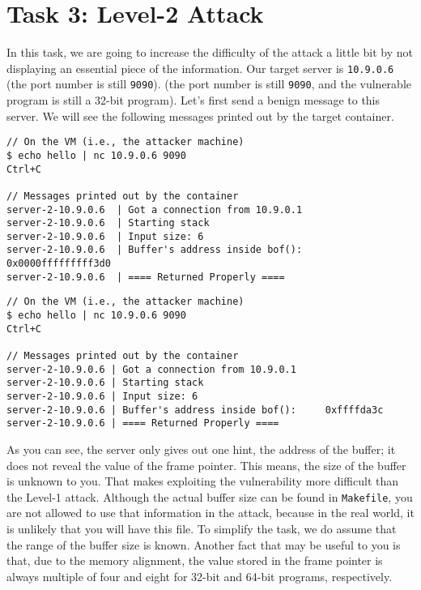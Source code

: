 \section{Task 3: Level-2 Attack} 

In this task, we are going to increase the difficulty
of the attack a little bit by not displaying an essential 
piece of the information. Our target server is 
\texttt{10.9.0.6} 
\ifdefined\arm
(the port number is still \texttt{9090}).
\else
(the port number is still \texttt{9090}, and
the vulnerable program is still a 32-bit program). 
\fi
Let's first send a benign message to this server. 
We will see the following messages printed out by the target container. 


\ifdefined\arm

\begin{lstlisting}
// On the VM (i.e., the attacker machine)
$ echo hello | nc 10.9.0.6 9090
Ctrl+C

// Messages printed out by the container
server-2-10.9.0.6  | Got a connection from 10.9.0.1
server-2-10.9.0.6  | Starting stack
server-2-10.9.0.6  | Input size: 6
server-2-10.9.0.6  | Buffer's address inside bof():     0x0000fffffffff3d0
server-2-10.9.0.6  | ==== Returned Properly ====
\end{lstlisting}
 
\else

\begin{lstlisting}
// On the VM (i.e., the attacker machine)
$ echo hello | nc 10.9.0.6 9090
Ctrl+C

// Messages printed out by the container
server-2-10.9.0.6 | Got a connection from 10.9.0.1
server-2-10.9.0.6 | Starting stack
server-2-10.9.0.6 | Input size: 6
server-2-10.9.0.6 | Buffer's address inside bof():     0xffffda3c
server-2-10.9.0.6 | ==== Returned Properly ====
\end{lstlisting}

\fi 
 
As you can see, the server only gives out one hint, the 
address of the buffer; it does not reveal the value of the 
frame pointer. This means, the size of the buffer is unknown
to you. That makes exploiting the vulnerability more 
difficult than the Level-1 attack. 
Although the actual buffer size can be found in 
\texttt{Makefile}, you are not allowed to use that 
information in the attack, because in the real world, it is 
unlikely that you will have this file. 
To simplify the task, we do assume that 
the range of the buffer size is known.
Another fact that
may be useful to you is that, due to the memory alignment,
the value stored in the
frame pointer is always multiple of four and eight
for 32-bit and 64-bit programs, respectively.



